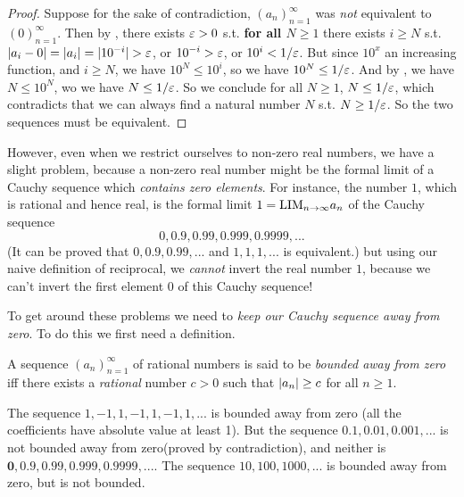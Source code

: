 \begin{proof}
 Suppose for the sake of contradiction, \((a_n)_{n = 1}^{\infty}\) was \emph{not} equivalent to \((0)_{n = 1}^{\infty}\).
Then by , there exists \(\varepsilon > 0\) s.t. \textbf{for all \(N \ge 1\)} there exists \(i \ge N\) s.t. \(\lvert a_i - 0\rvert = \lvert a_i\rvert = \lvert10^{-i}\rvert > \varepsilon\), or \(10^{-i} > \varepsilon\), or \(10^i < 1/\varepsilon\).
But since \(10^x\) an increasing function, and \(i \ge N\), we have \(10^N \le 10^i\), so we have \(10^N \le 1/\varepsilon\).
And by , we have \(N \le 10^N\), wo we have \(N \le 1/\varepsilon\).
So we conclude for all \(N \ge 1\), \(N \le 1/\varepsilon\), which contradicts  that we can always find a natural number \(N\) s.t. \(N \ge 1/\varepsilon\).
So the two sequences must be equivalent.
\end{proof}

However, even when we restrict ourselves to non-zero real numbers, we have a slight problem, because a non-zero real number might be the formal limit of a Cauchy sequence which \emph{contains zero elements}.
For instance, the number \(1\), which is rational and hence real, is the formal limit \(1 = \text{LIM}_{n \to \infty} a_n\) of the Cauchy sequence
\[
	0, 0.9, 0.99, 0.999, 0.9999,...
\]
(It can be proved that \(0, 0.9, 0.99,...\) and \(1, 1, 1, ...\) is equivalent.) but using our naive definition of reciprocal, we \emph{cannot} invert the real number \(1\), because we can’t invert the first element \(0\) of this Cauchy sequence!

To get around these problems we need to \emph{keep our Cauchy sequence away from zero}.
To do this we first need a definition.

\begin{definition}   \label{def 5.3.12}
A sequence \((a_n)_{n = 1}^{\infty}\) of rational numbers is said to be \emph{bounded away from zero} iff there exists a \emph{rational} number \(c > 0\) such that \(\lvert a_n\rvert \ge c\) for all \(n \ge 1\).
\end{definition}

\begin{example} \label{example 5.3.13}
The sequence \(1, -1, 1, -1, 1, -1, 1,...\) is bounded away from zero (all the coefficients have absolute value at least 1). 
But the sequence \(0.1, 0.01, 0.001,...\) is not bounded away from zero(proved by contradiction),
and neither is \(\textbf{0}, 0.9, 0.99, 0.999, 0.9999,....\)
The sequence \(10, 100, 1000,...\) is bounded away from zero, but is not bounded.
\end{example}


